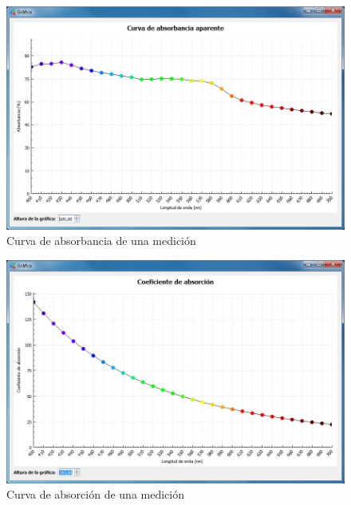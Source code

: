 \vfill
\newpage
\null
\vfill
\begin{figure}[H]
  \centering
  \includegraphics[width=1\linewidth]{./img/resultados-absorbancia.jpg}
\caption[]{Curva de absorbancia de una medici\'{o}n\label{fig:resultados-absorbancia}}
\end{figure}
\vfill
\begin{figure}[H]
  \centering
  \includegraphics[width=1\linewidth]{./img/resultados-absorcion.jpg}
\caption[]{Curva de absorci\'{o}n de una medici\'{o}n\label{fig:resultados-absorcion}}
\end{figure}
\vfill
\newpage
\null
\vfill
